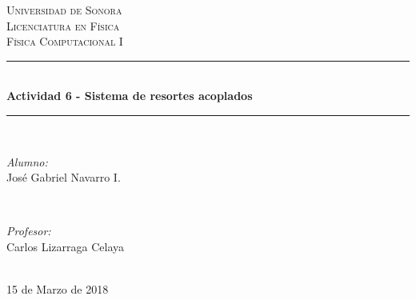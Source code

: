 \documentclass[12pt]{article}
\begin{document}
\begin{titlepage}

\newcommand{\HRule}{\rule{\linewidth}{0.5mm}} %

\center 

\textsc{\LARGE Universidad de Sonora}\\[1.5cm]
\textsc{\Large Licenciatura en Física}\\[0.5cm]
\textsc{\large Física Computacional I}\\[0.5cm]


\HRule \\[0.4cm]
{\huge \bfseries Actividad 6 - Sistema de resortes acoplados}\\[0.4cm] %
\HRule \\[1.5cm]
 

\begin{minipage}{0.4\textwidth}
\begin{flushleft} \large
\emph{Alumno:}\\
José Gabriel Navarro I.
\end{flushleft}
\end{minipage}
~
\begin{minipage}{0.4\textwidth}
\begin{flushright} \large
\emph{Profesor:} \\
Carlos Lizarraga Celaya
\end{flushright}
\end{minipage}\\[2cm]


15 de Marzo de 2018



\end{titlepage}
\end{document}
